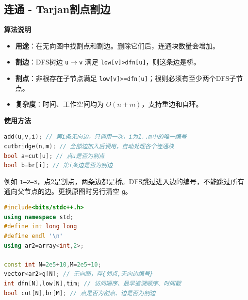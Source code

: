 \documentclass[10pt,landscape,a4paper]{article}
\begin{document}
\begin{multicols*}{3}
\subsection*{连通 - Tarjan割点割边}
\par\addvspace{0.7ex}\noindent\textbf{算法说明}\par\nobreak
\begin{itemize}
\item \textbf{用途}：在无向图中找割点和割边。删除它们后，连通块数量会增加。
\item \textbf{割边}：DFS树边 \texttt{u\allowbreak{}\ensuremath{\to}\allowbreak{}v} 满足 \texttt{l\allowbreak{}o\allowbreak{}w\allowbreak{}[\allowbreak{}v\allowbreak{}]\allowbreak{}\textgreater{}\allowbreak{}d\allowbreak{}f\allowbreak{}n\allowbreak{}[\allowbreak{}u\allowbreak{}]}，则这条边是桥。
\item \textbf{割点}：非根存在子节点满足 \texttt{l\allowbreak{}o\allowbreak{}w\allowbreak{}[\allowbreak{}v\allowbreak{}]\allowbreak{}\textgreater{}\allowbreak{}=\allowbreak{}d\allowbreak{}f\allowbreak{}n\allowbreak{}[\allowbreak{}u\allowbreak{}]}；根则必须有至少两个DFS子节点。
\item \textbf{复杂度}：时间、工作空间均为 $O(n+m)$，支持重边和自环。
\end{itemize}
\par\addvspace{0.7ex}\noindent\textbf{使用方法}\par\nobreak
\begin{lstlisting}[language=C++,numbers=none,basicstyle=\footnotesize\ttfamily]
add(u,v,i); // 第i条无向边，只调用一次，i为1..m中的唯一编号
cutbridge(n,m); // 全部边加入后调用，自动处理各个连通块
bool a=cut[u]; // 点u是否为割点
bool b=br[i]; // 第i条边是否为割边
\end{lstlisting}

例如 \texttt{1\allowbreak{}—\allowbreak{}2\allowbreak{}—\allowbreak{}3}，点2是割点，两条边都是桥。DFS跳过进入边的编号，不能跳过所有通向父节点的边。更换原图时另行清空 \texttt{g}。\par
\par{}\par
\begin{lstlisting}[language=C++]
#include<bits/stdc++.h>
using namespace std;
#define int long long
#define endl '\n'
using ar2=array<int,2>;

const int N=2e5+10,M=2e5+10;
vector<ar2>g[N]; // 无向图，存{邻点,无向边编号}
int dfn[N],low[N],tim; // 访问顺序、最早追溯顺序、时间戳
bool cut[N],br[M]; // 点是否为割点、边是否为割边


\end{lstlisting}
\end{multicols*}
\end{document}
